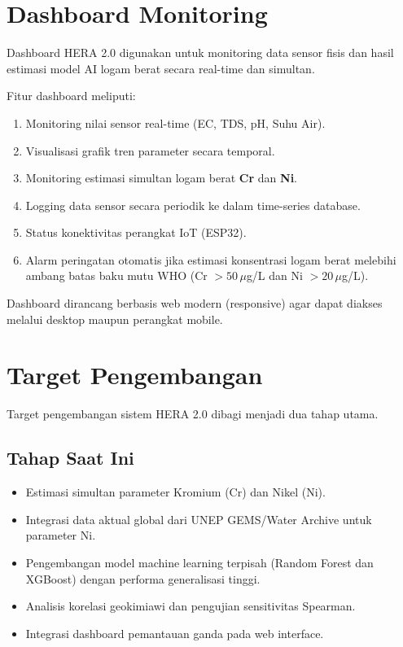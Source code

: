 \documentclass[12pt,a4paper]{article}
\begin{document}

\section{Dashboard Monitoring}

Dashboard HERA 2.0 digunakan untuk monitoring data sensor fisis dan hasil estimasi model AI logam berat secara real-time dan simultan.

Fitur dashboard meliputi:
\begin{enumerate}
    \item Monitoring nilai sensor real-time (EC, TDS, pH, Suhu Air).
    \item Visualisasi grafik tren parameter secara temporal.
    \item Monitoring estimasi simultan logam berat \textbf{Cr} dan \textbf{Ni}.
    \item Logging data sensor secara periodik ke dalam time-series database.
    \item Status konektivitas perangkat IoT (ESP32).
    \item Alarm peringatan otomatis jika estimasi konsentrasi logam berat melebihi ambang batas baku mutu WHO (Cr $> 50\,\mu$g/L dan Ni $> 20\,\mu$g/L).
\end{enumerate}

Dashboard dirancang berbasis web modern (responsive) agar dapat diakses melalui desktop maupun perangkat mobile.


\section{Target Pengembangan}

Target pengembangan sistem HERA 2.0 dibagi menjadi dua tahap utama.

\subsection{Tahap Saat Ini}
\begin{itemize}
    \item Estimasi simultan parameter Kromium (Cr) dan Nikel (Ni).
    \item Integrasi data aktual global dari UNEP GEMS/Water Archive untuk parameter Ni.
    \item Pengembangan model machine learning terpisah (Random Forest dan XGBoost) dengan performa generalisasi tinggi.
    \item Analisis korelasi geokimiawi dan pengujian sensitivitas Spearman.
    \item Integrasi dashboard pemantauan ganda pada web interface.
\end{itemize}
\end{document}
